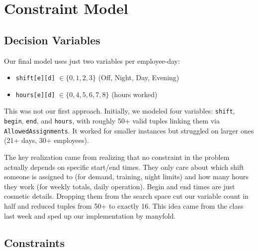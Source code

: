 \documentclass[11pt]{article}
\begin{document}
\section*{Constraint Model}

\subsection*{Decision Variables}

Our final model uses just two variables per employee-day:
\begin{itemize}
	\item \texttt{shift[e][d]} $\in \{0, 1, 2, 3\}$ (Off, Night, Day, Evening)
	\item \texttt{hours[e][d]} $\in \{0, 4, 5, 6, 7, 8\}$ (hours worked)
\end{itemize}

This was not our first approach. Initially, we modeled four variables: \texttt{shift}, \texttt{begin}, \texttt{end}, and \texttt{hours}, with roughly 50+ valid tuples linking them via \texttt{AllowedAssignments}. It worked for smaller instances but struggled on larger ones (21+ days, 30+ employees).

The key realization came from realizing that no constraint in the problem actually depends on specific start/end times. They only care about which shift someone is assigned to (for demand, training, night limits) and how many hours they work (for weekly totals, daily operation). Begin and end times are just cosmetic details. Dropping them from the search space cut our variable count in half and reduced tuples from 50+ to exactly 16. This idea came from the class last week and sped up our implementation by manyfold.

\subsection*{Constraints}
\end{document}
